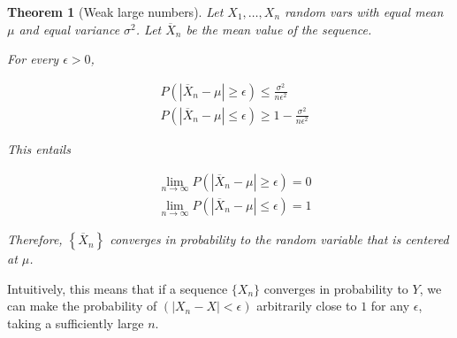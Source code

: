 \documentclass[a4paper, 12pt]{article}
\newtheorem{theorem}{Theorem}
\newtheorem{theorem}{Theorem}
\begin{document}
\begin{theorem}[Weak large numbers]
    Let $X_1, \ldots, X_n$ random vars with equal mean $\mu$ and equal 
    variance $\sigma^2$. Let $\overline{X}_n$ be the mean 
    value of the sequence.

    For every $\epsilon > 0$,

    \begin{align*}
        &P(|\overline{X}_n - \mu| \geq \epsilon) \leq \frac{\sigma^2}{n \epsilon^2} \\
        &P(|\overline{X}_n - \mu| \leq \epsilon) \geq 1 - \frac{\sigma^2}{n \epsilon^2}
    \end{align*}

    This entails 

    \begin{align*}
        &\lim_{n \to \infty} P(|\overline{X}_n - \mu| \geq \epsilon) = 0 \\ 
        &\lim_{n \to \infty} P(|\overline{X}_n - \mu| \leq \epsilon) = 1
    \end{align*}

    Therefore, $\left\{ \overline{X}_n \right\} $ converges in probability 
    to the random variable that is centered at $\mu$.

\end{theorem}

Intuitively, this means that if a sequence $\{ X_n \}$ converges in probability
to $Y$, we can make the probability of $(|X_n - X| < \epsilon)$ arbitrarily
close to $1$ for any $\epsilon$, taking a sufficiently large $n$.
\end{document}
